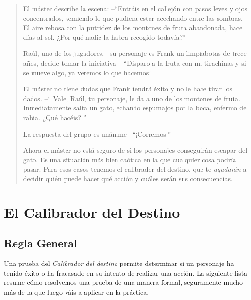 
\begin{quotation}

\noindent El máster describe la escena: --\enquote{Entráis en el callejón con pasos
 leves y ojos concentrados, temiendo lo que pudiera estar acechando entre 
 las sombras. El aire rebosa con la putridez de los montones de fruta abandonada, 
 hace días al sol. ¿Por qué nadie la habra recogido todavía?}

Raúl, uno de los jugadores, --su personaje es Frank un limpiabotas de trece años, 
decide tomar la iniciativa. --\enquote{Disparo a la fruta con mi tirachinas 
y si se mueve algo, ya veremos lo que hacemos}

El máster no tiene dudas que Frank tendrá éxito y no le hace tirar los dados. --\enquote{
Vale, Raúl, tu personaje, le da a uno de los montones de fruta. Inmediatamente
salta un gato, echando espumajos por la boca, enfermo de rabia. ¿Qué hacéis?
}

La respuesta del grupo es unánime --\enquote{¡Corremos!} 

Ahora el máster no está seguro de si los personajes conseguirán escapar del gato.
Es una situación más bien caótica en la que cualquier cosa podría pasar. Para esos
casos tenemos el calibrador del destino, que te \emph{ayudarán} a decidir quién puede 
hacer qué acción y cuáles serán sus consecuencias.

\end{quotation}

\section{El Calibrador del Destino}

\subsection{Regla General}

Una prueba del \emph{Calibrador del destino} 
permite determinar si un personaje ha tenido éxito o ha fracasado 
en su intento de realizar una acción. La siguiente lista resume 
cómo resolvemos una prueba de una manera formal, seguramente mucho 
más de la que luego váis a aplicar en la práctica.

